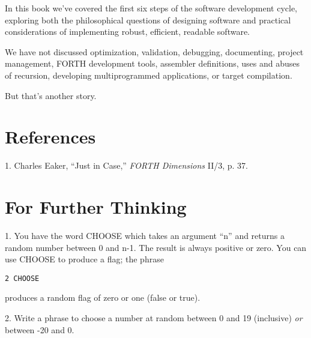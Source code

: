 In this book we've covered the first six steps of the software development
cycle, exploring both the philosophical questions of designing software
and practical considerations of implementing robust, efficient, readable
software.

We have not discussed optimization, validation, debugging, documenting,
project management, FORTH development tools, assembler
definitions, uses and abuses of recursion, developing multiprogrammed
applications, or target compilation.

But that's another story.

\section{References}

1. Charles Eaker, ``Just in Case,'' \emph{FORTH Dimensions} II/3, p. 37.

\section{For Further Thinking}

1. You have the word CHOOSE which takes an argument ``n'' and returns a
random number between 0 and n-1. The result is always positive or zero.
You can use CHOOSE to produce a flag; the phrase

\begin{verbatim}
2 CHOOSE
\end{verbatim}

produces a random flag of zero or one (false or true).

2. Write a phrase to choose a number at random between 0 and 19 (inclusive)
\emph{or} between -20 and 0.
